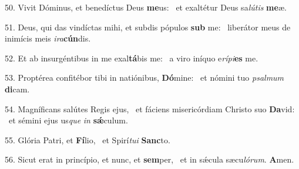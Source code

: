 50. Vivit Dóminus, et benedíctus Deus \textbf{me}us: \ast\  et exaltétur Deus sa\textit{lú}\textit{tis} \textbf{me}æ.\

51. Deus, qui das vindíctas mihi, et subdis pópulos \textbf{sub} me: \ast\  liberátor meus de inimícis meis \textit{i}\textit{ra}\textbf{cún}dis.\

52. Et ab insurgéntibus in me exal\textbf{tá}bis me: \ast\  a viro iníquo e\textit{rí}\textit{pi}\textbf{es} me.\

53. Proptérea confitébor tibi in natiónibus, \textbf{Dó}mine: \ast\  et nómini tuo \textit{psal}\textit{mum} \textbf{di}cam.\

54. Magníficans salútes Regis ejus, \dag\  et fáciens misericórdiam Christo suo \textbf{Da}vid: \ast\  et sémini ejus us\textit{que} \textit{in} \textbf{sǽ}culum.\

55. Glória Patri, et \textbf{Fí}lio, \ast\  et Spirí\textit{tu}\textit{i} \textbf{Sanc}to.\

56. Sicut erat in princípio, et nunc, et \textbf{sem}per, \ast\  et in sǽcula sæcu\textit{ló}\textit{rum}. \textbf{A}men.\

